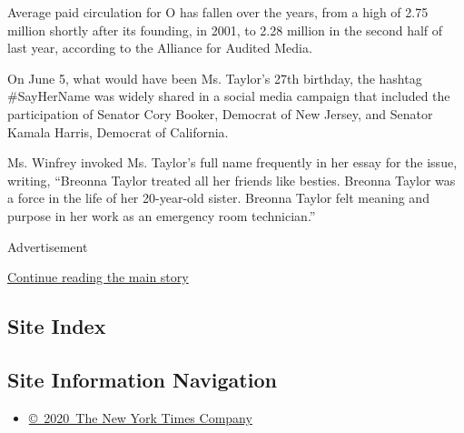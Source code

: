 Average paid circulation for O has fallen over the years, from a high of
2.75 million shortly after its founding, in 2001, to 2.28 million in the
second half of last year, according to the Alliance for Audited Media.

On June 5, what would have been Ms. Taylor's 27th birthday, the hashtag
\#SayHerName was widely shared in a social media campaign that included
the participation of Senator Cory Booker, Democrat of New Jersey, and
Senator Kamala Harris, Democrat of California.

Ms. Winfrey invoked Ms. Taylor's full name frequently in her essay for
the issue, writing, ``Breonna Taylor treated all her friends like
besties. Breonna Taylor was a force in the life of her 20-year-old
sister. Breonna Taylor felt meaning and purpose in her work as an
emergency room technician.''

Advertisement

\protect\hyperlink{after-bottom}{Continue reading the main story}

\hypertarget{site-index}{%
\subsection{Site Index}\label{site-index}}

\hypertarget{site-information-navigation}{%
\subsection{Site Information
Navigation}\label{site-information-navigation}}

\begin{itemize}
\tightlist
\item
  \href{https://help.nytimes.com/hc/en-us/articles/115014792127-Copyright-notice}{©~2020~The
  New York Times Company}
\end{itemize}

